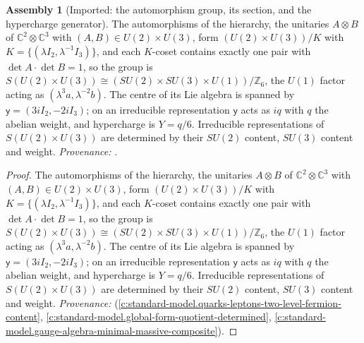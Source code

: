 \documentclass[11pt]{article}
\theoremstyle{definition}
\newtheorem{assembled}[theorem]{Assembly}
\theoremstyle{plain}
\providecommand{\C}{}\renewcommand{\C}{\mathbb{C}}
\begin{document}
\begin{assembled}[Imported: the automorphism group, its section, and the hypercharge generator]\label{c:lepton.imported-automorphism-group-section-hypercharge-generator}
The automorphisms of the hierarchy, the unitaries $A \otimes B$ of $\C^{2} \otimes \C^{3}$ with $(A, B) \in U(2) \times U(3)$, form $(U(2) \times U(3))/K$ with $K = \{(\lambda I_{2}, \lambda^{-1}I_{3})\}$, and each $K$-coset contains exactly one pair with $\det A \cdot \det B = 1$, so the group is $S(U(2) \times U(3)) \cong (SU(2) \times SU(3) \times U(1))/\mathbb{Z}_{6}$, the $U(1)$ factor acting as $(\lambda^{3}a, \lambda^{-2}b)$. The centre of its Lie algebra is spanned by $\mathsf{y} = (3iI_{2}, -2iI_{3})$; on an irreducible representation $\mathsf{y}$ acts as $iq$ with $q$ the abelian weight, and hypercharge is $Y = q/6$. Irreducible representations of $S(U(2) \times U(3))$ are determined by their $SU(2)$ content, $SU(3)$ content and weight. \emph{Provenance:} \cite[Thms.~4.1, 4.2, and the definition before Prop.~5.3]{ButlerT12}.
\end{assembled}
\begin{proof}
The automorphisms of the hierarchy, the unitaries $A \otimes B$ of $\C^{2} \otimes \C^{3}$ with $(A, B) \in U(2) \times U(3)$, form $(U(2) \times U(3))/K$ with $K = \{(\lambda I_{2}, \lambda^{-1}I_{3})\}$, and each $K$-coset contains exactly one pair with $\det A \cdot \det B = 1$, so the group is $S(U(2) \times U(3)) \cong (SU(2) \times SU(3) \times U(1))/\mathbb{Z}_{6}$, the $U(1)$ factor acting as $(\lambda^{3}a, \lambda^{-2}b)$. The centre of its Lie algebra is spanned by $\mathsf{y} = (3iI_{2}, -2iI_{3})$; on an irreducible representation $\mathsf{y}$ acts as $iq$ with $q$ the abelian weight, and hypercharge is $Y = q/6$. Irreducible representations of $S(U(2) \times U(3))$ are determined by their $SU(2)$ content, $SU(3)$ content and weight. \emph{Provenance:} \cite[Thms.~4.1, 4.2, and the definition before Prop.~5.3]{ButlerT12} (\ref{c:standard-model.quarks-leptons-two-level-fermion-content}, \ref{c:standard-model.global-form-quotient-determined}, \ref{c:standard-model.gauge-algebra-minimal-massive-composite}).

\end{proof}
\end{document}
